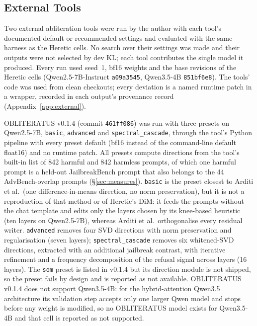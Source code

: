 \subsection{External Tools}
\label{sec:external}

Two external abliteration tools were run by the author with each tool's documented default or recommended settings
and evaluated with the same harness as the Heretic cells. No search over their settings was made and their outputs
were not selected by dev KL; each tool contributes the single model it produced. Every run used seed~1, bf16 weights
and the base revisions of the Heretic cells (Qwen2.5-7B-Instruct \texttt{a09a3545}, Qwen3.5-4B \texttt{851bf6e8}).
The tools' code was used from clean checkouts; every deviation is a named runtime patch in a wrapper, recorded in
each output's provenance record (Appendix~\ref{app:external}).

OBLITERATUS \cite{obliteratus2026} v0.1.4 (commit \texttt{461ff086}) was run with three presets on Qwen2.5-7B,
\texttt{basic}, \texttt{advanced} and \texttt{spectral\_cascade}, through the tool's Python pipeline with every
preset default (bf16 instead of the command-line default float16) and no runtime patch. All presets compute
directions from the tool's built-in list of 842 harmful and 842 harmless prompts, of which one harmful prompt is a
held-out JailbreakBench prompt that also belongs to the 44 AdvBench-overlap prompts (\S\ref{sec:measures}).
\texttt{basic} is the preset closest to Arditi et al.\ (one difference-in-means direction, no norm preservation),
but it is not a reproduction of that method or of Heretic's DiM: it feeds the prompts without the chat template and
edits only the layers chosen by its knee-based heuristic (ten layers on Qwen2.5-7B), whereas Arditi et al.\
orthogonalise every residual writer. \texttt{advanced} removes four SVD directions with norm preservation and
regularisation (seven layers); \texttt{spectral\_cascade} removes six whitened-SVD directions, extracted with an
additional jailbreak contrast, with iterative refinement and a frequency decomposition of the refusal signal across
layers (16 layers). The \texttt{som} preset is listed in v0.1.4 but its
direction module is not shipped, so the preset fails by design and is reported as not available. OBLITERATUS v0.1.4
does not support Qwen3.5-4B: for the hybrid-attention Qwen3.5 architecture its validation step accepts only one
larger Qwen model and stops before any weight is modified, so no OBLITERATUS model exists for Qwen3.5-4B and that
cell is reported as not supported.


